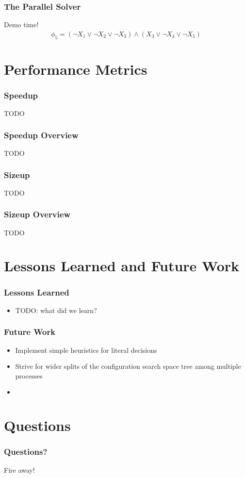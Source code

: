 \documentclass[handout]{beamer}
\begin{document}
\begin{frame}
	\frametitle{The Parallel Solver}
	\begin{center}
		Demo time!
		\begin{align*}
			\phi_5 = (\lnot X_1 \lor \lnot X_2 \lor \lnot X_3) \land (X_3 \lor \lnot X_4 \lor \lnot X_5)
		\end{align*}
	\end{center}
\end{frame}

\section{Performance Metrics}
\begin{frame}
	\frametitle{Speedup}
	TODO
\end{frame}

\begin{frame}
	\frametitle{Speedup Overview}
	TODO
\end{frame}

\begin{frame}
	\frametitle{Sizeup}
	TODO
\end{frame}

\begin{frame}
	\frametitle{Sizeup Overview}
	TODO
\end{frame}

\section{Lessons Learned and Future Work}
\begin{frame}
	\frametitle{Lessons Learned}
	\begin{itemize}
		\item TODO: what did we learn?
	\end{itemize}
\end{frame}

\begin{frame}
	\frametitle{Future Work}
	\begin{itemize}
		\item Implement simple heuristics for literal decisions
		\item Strive for wider splits of the configuration search space tree among multiple processes
		\item 
	\end{itemize}
\end{frame}

\section{Questions}
\begin{frame}
	\frametitle{Questions?}
	\begin{center}
		Fire away!
	\end{center}
\end{frame}

\end{document}
